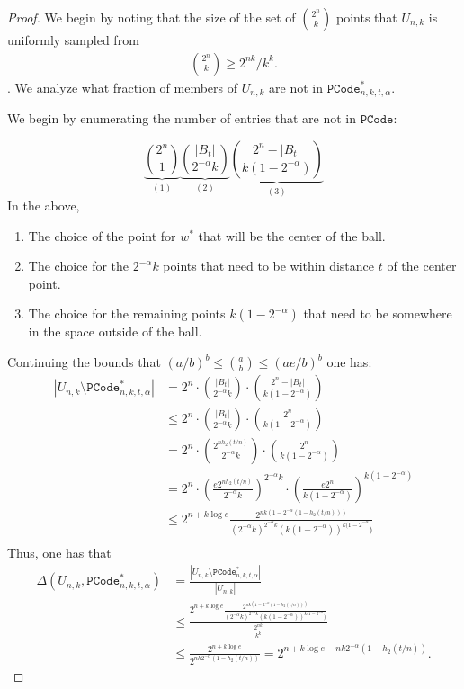  \begin{proof}
 We begin by noting that the size of the set of ${2^n \choose k}$ points that $U_{n,k}$ is uniformly sampled from
 \begin{align*}
 {2^n\choose k} \ge 2^{nk}/k^k.
 \end{align*}.  We analyze what fraction of members of $U_{n,k}$ are not in $\mathtt{PCode}_{n, k, t, \alpha}^{*}$.
 
 We begin by enumerating the number of entries that are not in $\mathtt{PCode}$:
 
 \[
  \underbrace{{2^n \choose 1}}_{(1)}  \underbrace{{|B_t| \choose 2^{-\alpha}k}}_{(2)}   \underbrace{{2^n-|B_t| \choose k(1-2^{-\alpha})}}_{(3)}
 \]
 In the above, 
 \begin{enumerate}
 \item The choice of the point for $w^*$ that will be the center of the ball.
 \item The choice for the $2^{-\alpha} k$ points that need to be within distance $t$ of the center point.
 \item The choice for the remaining points $k(1-2^{-\alpha})$ that need to be somewhere in the space outside of the ball.
 \end{enumerate}
 Continuing the bounds that $(a/b)^b \le {a\choose b} \le (ae/b)^b$ one has:
 \begin{align*}
|U_{n, k} \setminus \mathtt{PCode}_{n, k, t, \alpha}^{*}|  &=2^n \cdot {|B_t| \choose 2^{-\alpha}k}\cdot {2^n-|B_t| \choose k(1-2^{-\alpha})}\\
&\le 2^n \cdot {|B_t| \choose 2^{-\alpha}k}\cdot {2^n \choose k(1-2^{-\alpha})}\\
&= 2^n \cdot {2^{nh_2(t/n)} \choose 2^{-\alpha}k}\cdot {2^n \choose k(1-2^{-\alpha})}\\
&= 2^n \cdot \left(\frac{e2^{nh_2(t/n)}}{2^{-\alpha}k}\right)^{2^{-\alpha}k}\cdot \left(\frac{e2^n}{k(1-2^{-\alpha})}\right)^{k(1-2^{-\alpha})}\\
&\le 2^{n+k\log e} \frac{2^{nk(1-2^{-\alpha}(1-h_2(t/n)))}}{(2^{-\alpha}k)^{2^{-\alpha}k} (k(1-2^{-\alpha}))^{k(1-2^{-\alpha}})}\\
 \end{align*}
 Thus, one has that 
 \begin{align*}
\Delta(U_{n,k}, \mathtt{PCode}_{n, k, t, \alpha}^{*}) &= \frac{|U_{n, k} \setminus \mathtt{PCode}_{n, k, t, \alpha}^{*}|}{|U_{n, k}|}\\
&\le\frac{2^{n+k\log e} \frac{2^{nk(1-2^{-\alpha}(1-h_2(t/n)))}}{(2^{-\alpha}k)^{2^{-\alpha}k} (k(1-2^{-\alpha}))^{k(1-2^{-\alpha}})}}{\frac{2^{nk}}{k^k}}\\
&\le \frac{2^{n+k\log e}}{2^{nk2^{-\alpha}(1-h_2(t/n))}} = 2^{n+k\log e- nk2^{-\alpha}(1-h_2(t/n))}.
 \end{align*}
  \end{proof}